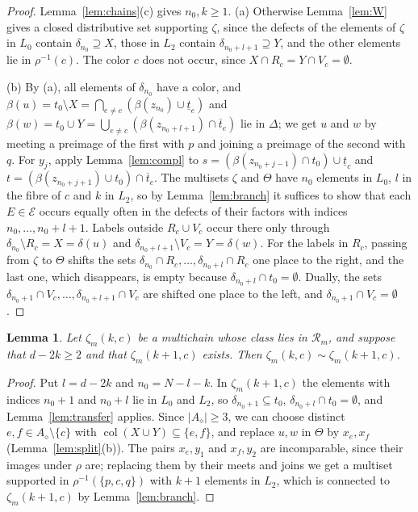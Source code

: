 \documentclass{amsart}
\newtheorem{lemma}[theorem]{Lemma}
\theoremstyle{definition}
\DeclareMathOperator{\col}{col}
\newcommand{\cE}{\mathcal E}
\newcommand{\dm}{\diamond}
\newcommand{\lt}{\underline{t}}
\newcommand{\ut}{\overline{t}}
\begin{document}
\begin{proof}
Lemma~\ref{lem:chains}(c) gives $n_0,k\ge1$. (a) Otherwise Lemma~\ref{lem:W} gives a closed distributive set supporting $\zeta$, since the defects of the elements of $\zeta$ in $L_0$ contain $\delta_{n_0}\supseteq X$, those in $L_2$ contain $\delta_{n_0+l+1}\supseteq Y$, and the other elements lie in $\rho^{-1}(c)$. The color $c$ does not occur, since $X\cap R_c=Y\cap V_c=\emptyset$.

(b) By (a), all elements of $\delta_{n_0}$ have a color, and $\beta(u)=t_0\setminus X=\bigcap_{e\ne c}(\beta(z_{n_0})\cup\lt_e)$ and $\beta(w)=t_0\cup Y=\bigcup_{e\ne c}(\beta(z_{n_0+l+1})\cap\ut_e)$ lie in $\Delta$; we get $u$ and $w$ by meeting a preimage of the first with $p$ and joining a preimage of the second with $q$. For $y_j$, apply Lemma~\ref{lem:compl} to $s=(\beta(z_{n_0+j-1})\cap t_0)\cup\lt_c$ and $t=(\beta(z_{n_0+j+1})\cup t_0)\cap\ut_c$. The multisets $\zeta$ and $\Theta$ have $n_0$ elements in $L_0$, $l$ in the fibre of $c$ and $k$ in $L_2$, so by Lemma~\ref{lem:branch} it suffices to show that each $E\in\cE$ occurs equally often in the defects of their factors with indices $n_0,\dots,n_0+l+1$. Labels outside $R_c\cup V_c$ occur there only through $\delta_{n_0}\setminus R_c=X=\delta(u)$ and $\delta_{n_0+l+1}\setminus V_c=Y=\delta(w)$. For the labels in $R_c$, passing from $\zeta$ to $\Theta$ shifts the sets $\delta_{n_0}\cap R_c,\dots,\delta_{n_0+l}\cap R_c$ one place to the right, and the last one, which disappears, is empty because $\delta_{n_0+l}\cap t_0=\emptyset$. Dually, the sets $\delta_{n_0+1}\cap V_c,\dots,\delta_{n_0+l+1}\cap V_c$ are shifted one place to the left, and $\delta_{n_0+1}\cap V_c=\emptyset$.
\end{proof}

\begin{lemma}\label{lem:raise}
Let $\zeta_m(k,c)$ be a multichain whose class lies in $\mathcal R_m$, and suppose that $d-2k\ge2$ and that $\zeta_m(k+1,c)$ exists. Then $\zeta_m(k,c)\sim\zeta_m(k+1,c)$.
\end{lemma}

\begin{proof}
Put $l=d-2k$ and $n_0=N-l-k$. In $\zeta_m(k+1,c)$ the elements with indices $n_0+1$ and $n_0+l$ lie in $L_0$ and $L_2$, so $\delta_{n_0+1}\subseteq t_0$, $\delta_{n_0+l}\cap t_0=\emptyset$, and Lemma~\ref{lem:transfer} applies. Since $|A_\dm|\ge3$, we can choose distinct $e,f\in A_\dm\setminus\{c\}$ with $\col(X\cup Y)\subseteq\{e,f\}$, and replace $u,w$ in $\Theta$ by $x_e,x_f$ (Lemma~\ref{lem:split}(b)). The pairs $x_e,y_1$ and $x_f,y_2$ are incomparable, since their images under $\rho$ are; replacing them by their meets and joins we get a multiset supported in $\rho^{-1}(\{p,c,q\})$ with $k+1$ elements in $L_2$, which is connected to $\zeta_m(k+1,c)$ by Lemma~\ref{lem:branch}.
\end{proof}
\end{document}

